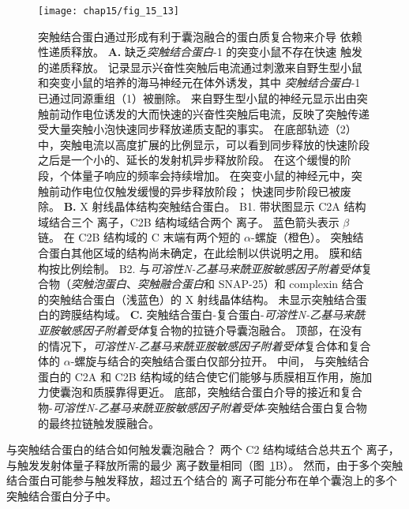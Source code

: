 \begin{figure}[htbp]
	\centering
	\texttt{[image: chap15/fig\_15\_13]}
	\caption{突触结合蛋白通过形成有利于囊泡融合的蛋白质复合物来介导  依赖性递质释放。
		\textbf{A.} 缺乏\textit{突触结合蛋白}-1 的突变小鼠不存在快速  触发的递质释放。
		记录显示兴奋性突触后电流通过刺激来自野生型小鼠和突变小鼠的培养的海马神经元在体外诱发，其中 \textit{突触结合蛋白}-1 已通过同源重组（1）被删除。
		来自野生型小鼠的神经元显示出由突触前动作电位诱发的大而快速的兴奋性突触后电流，反映了突触传递受大量突触小泡快速同步释放递质支配的事实。
		在底部轨迹（2）中，突触电流以高度扩展的比例显示，可以看到同步释放的快速阶段之后是一个小的、延长的发射机异步释放阶段。
		在这个缓慢的阶段，个体量子响应的频率会持续增加。
		在突变小鼠的神经元中，突触前动作电位仅触发缓慢的异步释放阶段； 
		快速同步阶段已被废除\cite{geppert1994synaptotagmin}。
		\textbf{B.} X 射线晶体结构突触结合蛋白。
		B1. 带状图显示 C2A 结构域结合三个  离子，C2B 结构域结合两个  离子。
		蓝色箭头表示 $\beta$ 链。
		在 C2B 结构域的 C 末端有两个短的 $\alpha$-螺旋（橙色）。
		突触结合蛋白其他区域的结构尚未确定，在此绘制以供说明之用。
		膜和结构按比例绘制\cite{fernandez2001three}。
		B2. 与\textit{可溶性N-乙基马来酰亚胺敏感因子附着受体}复合物（\textit{突触泡蛋白}、\textit{突触融合蛋白}和 SNAP-25）和 complexin 结合的突触结合蛋白（浅蓝色）的 X 射线晶体结构。
		未显示突触结合蛋白的跨膜结构域\cite{zhou2017primed}。
		\textbf{C.} 突触结合蛋白-复合蛋白-\textit{可溶性N-乙基马来酰亚胺敏感因子附着受体}复合物的拉链介导囊泡融合。
		顶部，在没有  的情况下，\textit{可溶性N-乙基马来酰亚胺敏感因子附着受体}复合体和复合体的 $\alpha$-螺旋与结合的突触结合蛋白仅部分拉开。
		中间， 与突触结合蛋白的 C2A 和 C2B 结构域的结合使它们能够与质膜相互作用，施加力使囊泡和质膜靠得更近。
		底部，突触结合蛋白介导的接近和复合物-\textit{可溶性N-乙基马来酰亚胺敏感因子附着受体}-突触结合蛋白复合物的最终拉链触发膜融合\cite{zhou2017primed}。}
	\label{fig:15_13}
\end{figure}


 与突触结合蛋白的结合如何触发囊泡融合？
两个 C2 结构域结合总共五个  离子，与触发发射体量子释放所需的最少  离子数量相同（图~\ref{fig:15_13}B）。
然而，由于多个突触结合蛋白可能参与触发释放，超过五个结合的  离子可能分布在单个囊泡上的多个突触结合蛋白分子中。


